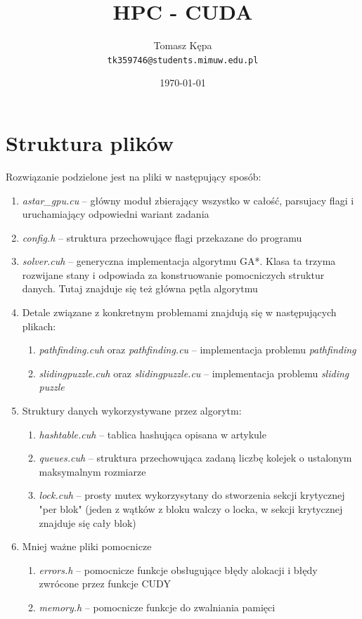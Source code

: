 \documentclass{article}
\date\today
\title{HPC - CUDA}
\author{Tomasz Kępa \\ \texttt{tk359746@students.mimuw.edu.pl}}
\begin{document}
\maketitle


\section{Struktura plików}
Rozwiązanie podzielone jest na pliki w następujący sposób:
\begin{enumerate}
  \item \emph{astar\_gpu.cu} -- główny moduł zbierający wszystko w całość, parsujacy flagi i uruchamiający odpowiedni wariant zadania
  \item \emph{config.h} -- struktura przechowujące flagi przekazane do programu
  \item \emph{solver.cuh} -- generyczna implementacja algorytmu GA*. 
  			Klasa ta trzyma rozwijane stany i odpowiada za konstruowanie pomocniczych struktur danych. 
  			Tutaj znajduje się też główna pętla algorytmu
  \item Detale związane z konkretnym problemami znajdują się w następujących plikach:
    \begin{enumerate}
      \item \emph{pathfinding.cuh} oraz \emph{pathfinding.cu} -- implementacja problemu \emph{pathfinding}
      \item \emph{slidingpuzzle.cuh} oraz \emph{slidingpuzzle.cu} -- implementacja problemu \emph{sliding puzzle}
    \end{enumerate}
  \item Struktury danych wykorzystywane przez algorytm:
    \begin{enumerate}
      \item \emph{hashtable.cuh} -- tablica hashująca opisana w artykule
      \item \emph{queues.cuh} -- struktura przechowująca zadaną liczbę kolejek o ustalonym maksymalnym rozmiarze
      \item \emph{lock.cuh} -- prosty mutex wykorzysytany do stworzenia sekcji krytycznej "per blok" 
                (jeden z wątków z bloku walczy o locka, w sekcji krytycznej znajduje się cały blok)
    \end{enumerate}
  \item Mniej ważne pliki pomocnicze
    \begin{enumerate}
      \item \emph{errors.h} -- pomocnicze funkcje obsługujące błędy alokacji i błędy zwrócone przez funkcje CUDY
      \item \emph{memory.h} -- pomocnicze funkcje do zwalniania pamięci
    \end{enumerate}
\end{enumerate}
\end{document}
